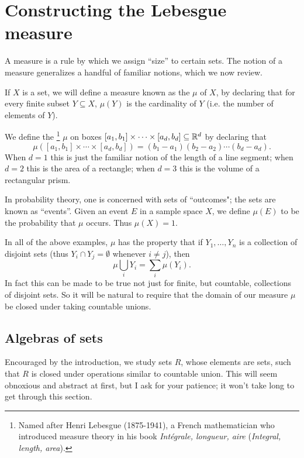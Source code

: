 \chapter{Constructing the Lebesgue measure}
\label{ch:ch1}

\label{measureChapter}
A measure is a rule by which we assign ``size'' to certain sets.
The notion of a measure generalizes a handful of familiar notions, which we now review.
\begin{example}
\label{examples of measures}
If $X$ is a set, we will define a measure known as the  $\mu$ of $X$, by declaring that for every finite subset $Y \subseteq X$, $\mu(Y)$ is the cardinality of $Y$ (i.e. the number of elements of $Y$).

We define the \footnote{Named after Henri Lebesgue (1875-1941), a French mathematician who introduced measure theory in his book \emph{Intégrale, longueur, aire} (\emph{Integral, length, area}).}
$\mu$ on boxes $[a_1, b_1] \times \cdots \times [a_d, b_d] \subseteq \mathbb{R}^d$ by declaring that
\[\mu([a_1, b_1] \times \cdots \times [a_d, b_d]) = (b_1 - a_1)(b_2 - a_2)\cdots(b_{d} - a_d).\]
When $d = 1$ this is just the familiar notion of the length of a line segment; when $d = 2$ this is the area of a rectangle; when $d = 3$ this is the volume of a rectangular prism.

In probability theory, one is concerned with sets of ``outcomes"; the sets are known as ``events''. Given an event $E$ in a sample space $X$, we define $\mu(E)$ to be the probability that $\mu$ occurs. Thus $\mu(X) = 1$.
\end{example}

\begin{subsec}
In all of the above examples, $\mu$ has the property that if $Y_1, \dots, Y_{n}$ is a collection of disjoint sets (thus $Y_{i} \cap Y_{j} = \emptyset$ whenever $i \neq j$), then
\[\mu\bigcup_{i} Y_{i} = \sum_{i} \mu(Y_i).\]
In fact this can be made to be true not just for finite, but countable, collections of disjoint sets.
So it will be natural to require that the domain of our measure $\mu$ be closed under taking countable unions.
\end{subsec}

\section{Algebras of sets}
Encouraged by the introduction, we study sets $R$, whose elements are sets, such that $R$ is closed under operations similar to countable union.
This will seem obnoxious and abstract at first, but I ask for your patience; it won't take long to get through this section.

